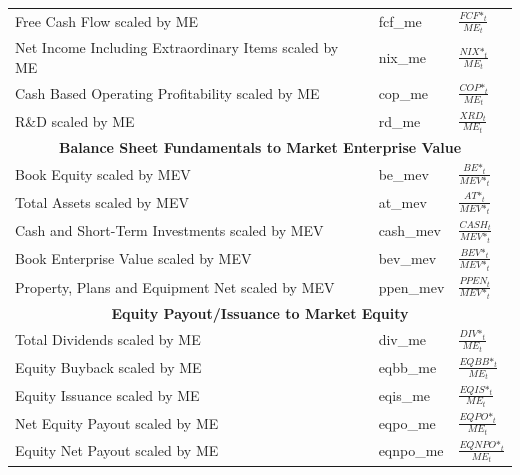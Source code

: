 \documentclass[12pt,title,fleqn]{article}
\begin{document}
{\begin{longtable}{@{\extracolsep{\fill}}|p{6cm}|l|p{8cm}|@{}}
	Free Cash Flow scaled by ME & fcf\_me &$\frac{FCF\mbox{*}_t}{ME_t}$ \\
	
	Net Income Including Extraordinary Items scaled by ME & nix\_me &$\frac{NIX\mbox{*}_t}{ME_t}$\\
	
	Cash Based Operating Profitability scaled by ME & cop\_me &$\frac{COP\mbox{*}_t}{ME_t}$\\
	
	R\&D scaled by ME & rd\_me &$ \frac{XRD_t}{ME_t}$\\
	
    \hline 
	\multicolumn{3}{|c|}{\textbf{Balance Sheet Fundamentals to Market Enterprise Value}} \\
	\hline 	
	
	Book Equity scaled by MEV & be\_mev &$\frac{BE\mbox{*}_t}{MEV\mbox{*}_t}$ \\

    Total Assets scaled by MEV & at\_mev &$\frac{AT\mbox{*}_t}{MEV\mbox{*}_t}$ \\
	
    Cash and Short-Term Investments scaled by MEV & cash\_mev &$\frac{CASH_t}{MEV\mbox{*}_t}$ \\
	
    Book Enterprise Value scaled by MEV & bev\_mev &$\frac{BEV\mbox{*}_t}{MEV\mbox{*}_t}$ \\
	
    Property, Plans and Equipment Net scaled by MEV & ppen\_mev &$\frac{PPEN_t}{MEV\mbox{*}_t}$ \\
	
    \hline 
	\multicolumn{3}{|c|}{\textbf{Equity Payout/Issuance to Market Equity}} \\
	\hline 	

    Total Dividends scaled by ME & div\_me &$\frac{DIV\mbox{*}_t}{ME_t}$ \\
	
    Equity Buyback scaled by ME & eqbb\_me &$\frac{EQBB\mbox{*}_t}{ME_t}$ \\
	
    Equity Issuance scaled by ME & eqis\_me &$\frac{EQIS\mbox{*}_t}{ME_t}$ \\
	
    Net Equity Payout scaled by ME & eqpo\_me &$\frac{EQPO\mbox{*}_t}{ME_t}$\\
	
   Equity Net Payout scaled by ME & eqnpo\_me &$\frac{EQNPO\mbox{*}_t}{ME_t}$\\
	

\end{longtable}}
\end{document}
